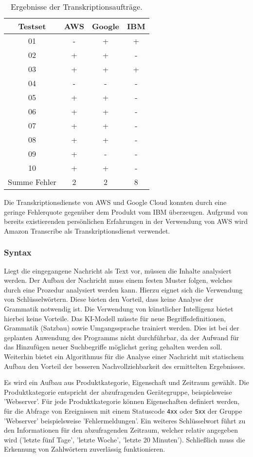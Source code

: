 \begin{table}[hb!]
\centering
\begin{tabular}{c|c|c|c}
Testset 		& AWS	& Google		& IBM \\
\hline
01			& -		& +			& + \\
02			& +		& +			& - \\
03			& +		& +			& + \\
04			& -		& -			& - \\
05			& +		& +			& - \\
06			& +		& +			& - \\
07			& +		& +			& - \\
08			& +		& +			& - \\
09			& +		& -			& - \\
10			& +		& +			& - \\
\hline
Summe Fehler	& 2		& 2			& 8
\end{tabular}
\caption{Ergebnisse der Transkriptionsaufträge.}
\label{tab:erg-transkript}
\end{table}

Die Transkriptionsdienste von AWS und Google Cloud konnten durch eine geringe Fehlerquote gegenüber dem Produkt vom IBM überzeugen. Aufgrund von bereits existierenden persönlichen Erfahrungen in der Verwendung von AWS wird Amazon Transcribe als Transkriptionsdienst verwendet.

\subsubsection{Syntax}
\label{sec:syntax}

Liegt die eingegangene Nachricht als Text vor, müssen die Inhalte analysiert werden. Der Aufbau der Nachricht muss einem festen Muster folgen, welches durch eine Prozedur analysiert werden kann. Hierzu eignet sich die Verwendung von Schlüsselwörtern. Diese bieten den Vorteil, dass keine Analyse der Grammatik notwendig ist. Die Verwendung von künstlicher Intelligenz bietet hierbei keine Vorteile. Das KI-Modell müsste für neue Begriffsdefinitionen, Grammatik (Satzbau) sowie Umgangssprache trainiert werden. Dies ist bei der geplanten Anwendung des Programms nicht durchführbar, da der Aufwand für das Hinzufügen neuer Suchbegriffe möglichst gering gehalten werden soll. Weiterhin bietet ein Algorithmus für die Analyse einer Nachricht mit statischem Aufbau den Vorteil der besseren Nachvollziehbarkeit des ermittelten Ergebnisses.

Es wird ein Aufbau aus Produktkategorie, Eigenschaft und Zeitraum gewählt. Die Produktkategorie entspricht der abzufragenden Gerätegruppe, beispielsweise 'Webserver'. Für jede Produktkategorie können Eigenschaften definiert werden, für die Abfrage von Ereignissen mit einem Statuscode \lstinline{4xx} oder \lstinline{5xx} der Gruppe 'Webserver' beispielsweise 'Fehlermeldungen'. Ein weiteres Schlüsselwort führt zu den Informationen für den abzufragenden Zeitraum, welcher relativ angegeben wird ('letzte fünf Tage', 'letzte Woche', 'letzte 20 Minuten'). Schließlich muss die Erkennung von Zahlwörtern zuverlässig funktionieren.

